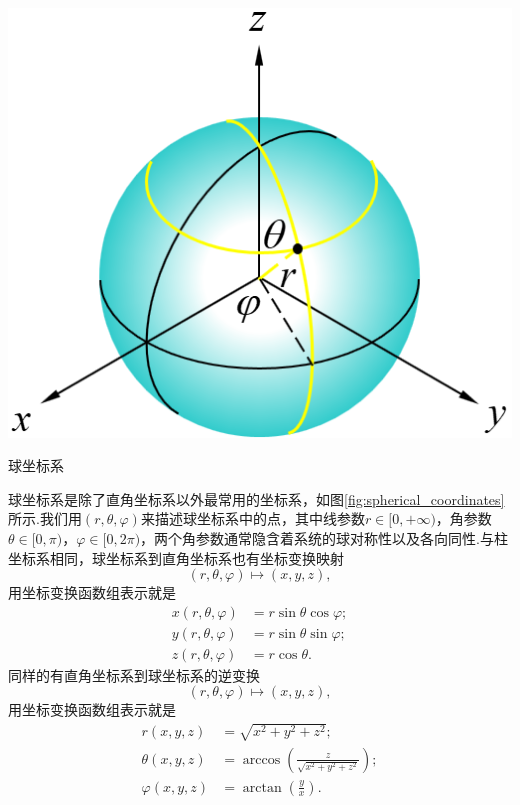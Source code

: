		\begin{marginfigure}
			\centering
			\includegraphics[width=1\textwidth]{figures/spherical_coordinates.png}
			\caption{球坐标系}\label{fig:spherical_coordinates}
		\end{marginfigure}
		球坐标系是除了直角坐标系以外最常用的坐标系，如图\ref{fig:spherical_coordinates}所示.我们用$(r,\theta,\varphi)$来描述球坐标系中的点，其中线参数$r\in[0,+\infty)$，角参数$\theta\in[0,\pi)$，$\varphi\in[0,2\pi)$，两个角参数通常隐含着系统的球对称性以及各向同性.与柱坐标系相同，球坐标系到直角坐标系也有坐标变换映射
		\begin{equation}\label{eq:rthetaphi to xyz 1}
			(r,\theta,\varphi)\mapsto(x,y,z),
		\end{equation}
		用坐标变换函数组表示就是
		\begin{equation}\label{eq:rthetaphi to xyz 2}
			\begin{split}
				x(r,\theta,\varphi)&=r\sin\theta \cos\varphi;\\
				y(r,\theta,\varphi)&=r\sin\theta \sin\varphi;\\
				z(r,\theta,\varphi)&=r\cos\theta.
			\end{split}
		\end{equation}
		同样的有直角坐标系到球坐标系的逆变换
		\begin{equation}\label{eq:xyz to rthetaphi 1}
			(r,\theta,\varphi)\mapsto(x,y,z),
		\end{equation}
		用坐标变换函数组表示就是
		\begin{equation}\label{eq:xyz to rthetaphi 2}
			\begin{split}
				r(x,y,z)&=\sqrt{x^2+y^2+z^2};\\
				\theta(x,y,z)&=\arccos\left(\frac{z}{\sqrt{x^2+y^2+z^2}}\right);\\
				\varphi(x,y,z)&=\arctan(\frac{y}{x}).
			\end{split}
		\end{equation}


